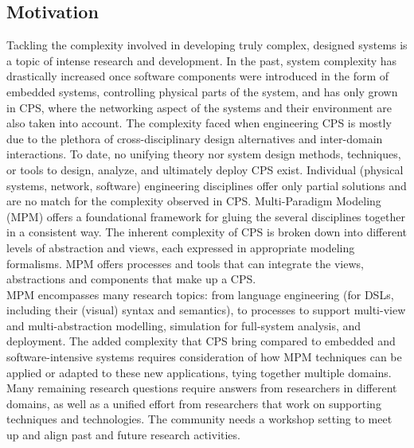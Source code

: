 \subsection{Motivation}
Tackling the complexity involved in developing truly complex, designed systems 
is a topic of intense research and development.
In the past, system complexity has drastically increased once software components 
were introduced in the form of embedded systems, controlling physical parts of 
the system, and has only grown in CPS, where the networking aspect of the systems 
and their environment are also taken into account.
The complexity faced when engineering CPS is mostly due to the plethora of 
cross-disciplinary design alternatives and inter-domain interactions.
To date, no unifying theory nor system design methods, techniques, or tools to 
design, analyze, and ultimately deploy CPS exist.
Individual (physical systems, network, software) engineering disciplines offer 
only partial solutions and are no match for the complexity observed in CPS.
Multi-Paradigm Modeling (MPM) offers a foundational framework for gluing the 
several disciplines together in a consistent way.
The inherent complexity of CPS is broken down into different levels of 
abstraction and views, each expressed in appropriate modeling formalisms.
MPM offers processes and tools that can integrate the views, abstractions and 
components that make up a CPS.\\
MPM encompasses many research topics: from language engineering (for DSLs, 
including their (visual) syntax and semantics), to processes to support multi-view 
and multi-abstraction modelling, simulation for full-system analysis, and deployment.
The added complexity that CPS bring compared to embedded and software-intensive 
systems requires consideration of how MPM techniques can be applied or adapted 
to these new applications, tying together multiple domains.
Many remaining research questions require answers from researchers in different 
domains, as well as a unified effort from researchers that work on supporting 
techniques and technologies.
The community needs a workshop setting to meet up and align past and future 
research activities.


